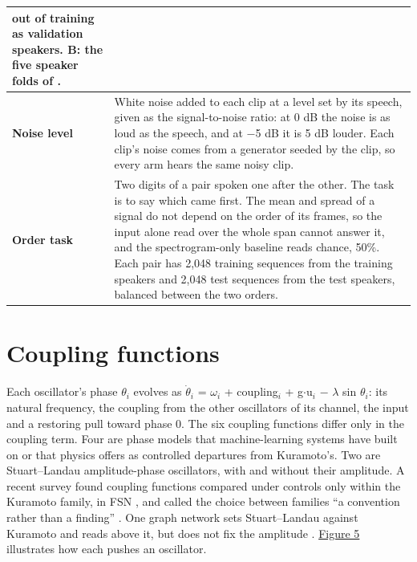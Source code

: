 \documentclass{article}
\makeatletter
\newcommand{\iclr@floatbarrier}{\par\vspace{\z@}%
  \ifx\@deferlist\@empty\else\clearpage\fi}
\let\iclr@section\section
\renewcommand{\section}{\iclr@floatbarrier\iclr@section}
\makeatother
\begin{document}
{\begin{longtable}[]{@{}
  >{\raggedright\arraybackslash}p{}
  >{\raggedright\arraybackslash}p{}@{}}
out of training as validation speakers. B: the five speaker folds of
\citet{becker2024}. \\
\cmidrule{1-2}\textbf{Noise level} & White noise added to each clip at a
level set by its speech, given as the signal-to-noise ratio: at 0 dB the
noise is as loud as the speech, and at \ensuremath{-}5 dB it is 5 dB
louder. Each clip's noise comes from a generator seeded by the clip, so
every arm hears the same noisy clip. \\
\cmidrule{1-2}\textbf{Order task} & Two digits of a pair spoken one
after the other. The task is to say which came first. The mean and
spread of a signal do not depend on the order of its frames, so the
input alone read over the whole span cannot answer it, and the
spectrogram-only baseline reads chance, 50\%. Each pair has 2,048
training sequences from the training speakers and 2,048 test sequences
from the test speakers, balanced between the two orders. \\
\end{longtable}
}

\section{Coupling functions}\label{sec-B}

Each oscillator's phase \ensuremath{\theta_{i}} evolves as
\ensuremath{\dot{\theta}_{i}} = \ensuremath{\omega_{i}} +
coupling\ensuremath{_{i}} + g\ensuremath{\cdot}u\ensuremath{_{i}}
\ensuremath{-} \ensuremath{\lambda} sin \ensuremath{\theta_{i}}: its
natural frequency, the coupling from the other oscillators of its
channel, the input and a restoring pull toward phase 0. The six coupling
functions differ only in the coupling term. Four are phase models that
machine-learning systems have built on or that physics offers as
controlled departures from Kuramoto's. Two are Stuart--Landau
amplitude-phase oscillators, with and without their amplitude. A recent
survey found coupling functions compared under controls only within the
Kuramoto family, in FSN \citep{nunley2026}, and called the choice
between families ``a convention rather than a finding''
\citep{kryski2026}. One graph network sets Stuart--Landau against
Kuramoto and reads above it, but does not fix the amplitude
\citep{zhang2026}. \hyperref[fig-fig08-appB-coupling-functions]{Figure
5} illustrates how each pushes an oscillator.
\end{document}
